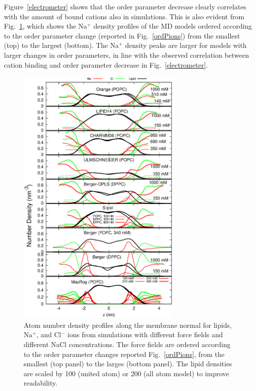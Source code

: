 \documentclass[twoside,twocolumn,9pt]{article}
\begin{document}
Figure~\ref{electrometer} shows that the order parameter decrease clearly correlates with the
amount of bound cations also in simulations. This is also evident from Fig.~\ref{NAdensities},
which shows the Na$^+$ density profiles of the MD models
ordered according to the order parameter change 
(reported in Fig.~\ref{ordPions}) from the smallest (top) to the largest (bottom).
The Na$^+$ density peaks are larger for models with larger changes in order parameters,
in line with the observed correlation between cation binding and order parameter decrease in
Fig.~\ref{electrometer}.
\begin{figure}[t]
  \centering
  \includegraphics[width=8cm]{../Fig/NAdensities.eps}
  \caption{\label{NAdensities}
    Atom number density profiles along the membrane normal for lipids, Na$^+$, and Cl$^-$ ions 
    from simulations with different force fields and different NaCl concentrations. 
    The force fields are ordered according to the order parameter changes 
    reported Fig.~\ref{ordPions}, from the smallest (top panel) to the larges (bottom panel).
    The lipid densities are scaled by 100 (united atom) or 200 (all atom model) to improve readability. 
}
\end{figure}
\end{document}
